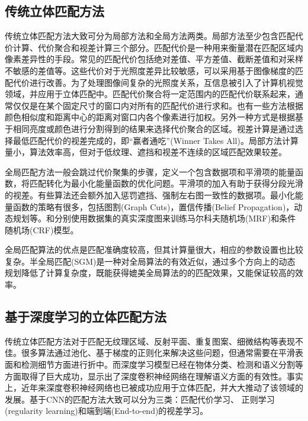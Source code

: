 \subsection{传统立体匹配方法}
传统立体匹配方法大致可分为局部方法和全局方法两类。局部方法至少包含匹配代价计算、代价聚合和视差计算三个部分。匹配代价是一种用来衡量潜在匹配区域内像素差异性的手段。常见的匹配代价包括绝对差值、平方差值、截断差值和对采样不敏感的差值\cite{Birchfield1999}等。这些代价对于光照度差异比较敏感，可以采用基于图像梯度的匹配代价进行改善\cite{SGM_3}。为了处理图像间复杂的光照度关系，互信息被引入了计算机视觉领域\cite{Viola1997}，并应用于立体匹配中\cite{SGM_6}。匹配代价聚合将一定范围内的匹配代价联系起来，通常仅仅是在某个固定尺寸的窗口内对所有的匹配代价进行求和\cite{Hirschmüller2002}。也有一些方法根据颜色相似度和距离中心的距离对窗口内各个像素进行加权\cite{SGM_10}。另外一种方式是根据基于相同亮度或颜色进行分割得到的结果来选择代价聚合的区域\cite{Zitnick:2004}。视差计算是通过选择最低匹配代价的视差完成的\cite{Hirschmüller2002}，即“赢者通吃”(Winner Takes All)。局部方法计算量小，算法效率高，但对于低纹理、遮挡和视差不连续的区域匹配效果较差。

全局匹配方法一般会跳过代价聚集的步骤，定义一个包含数据项和平滑项的能量函数，将匹配转化为最小化能量函数的优化问题。平滑项的加入有助于获得分段光滑的视差。有些算法还会额外加入惩罚遮挡\cite{SGM_13}、强制左右图一致性\cite{Zitnick:2004}的数据项。最小化能量函数的策略有很多，包括图割(Graph Cuts)\cite{SGM_13}，置信传播(Belief Propagation)\cite{SGM_3}，动态规划\cite{VanMeerbergen2002}等。\cite{MRF}和\cite{CRF}分别使用数据集的真实深度图来训练马尔科夫随机场(MRF)和条件随机场(CRF)模型。

全局匹配算法的优点是匹配准确度较高，但其计算量很大，相应的参数设置也比较复杂。半全局匹配(SGM)\cite{Hirschmuller08}是一种对全局算法的有效近似，通过多个方向上的动态规划降低了计算复杂度，既能获得媲美全局算法的的匹配效果，又能保证较高的效率。

\subsection{基于深度学习的立体匹配方法}
传统立体匹配方法对于匹配无纹理区域、反射平面、重复图案、细微结构等表现不佳。很多算法通过池化、基于梯度的正则化\cite{geiger2010efficient, hirschmuller2005accurate}来解决这些问题，但通常需要在平滑表面和检测细节方面进行折中。而深度学习模型已经在物体分类\cite{krizhevsky2012imagenet}、检测\cite{girshick2014rich}和语义分割\cite{badrinarayanan2015segnet}等方面取得了巨大成功，显示出了深度卷积神经网络在理解语义方面的有效性。事实上，近年来深度卷积神经网络也已被成功应用于立体匹配，并大大推动了该领域的发展。基于CNN的匹配方法大致可以分为三类：匹配代价学习、
正则学习(regularity learning)和端到端(End-to-end)的视差学习。

